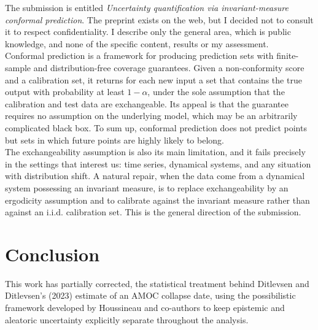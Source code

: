 \documentclass[12pt,a4paper]{article}
\theoremstyle{definition}
\theoremstyle{plain}
\begin{document}
\noindent The submission is entitled \emph{Uncertainty quantification via invariant-measure conformal
prediction}. The preprint exists on the web, but I decided not to consult it to respect confidentiality. I describe only the general area, which is public
knowledge, and none of the specific content, results or my assessment. \\

\noindent Conformal prediction \cite{shafer2008,angelopoulos2023} is a framework for producing
prediction sets with finite-sample and distribution-free coverage guarantees. Given a
non-conformity score and a calibration set, it returns for each new input a set that contains
the true output with probability at least $1-\alpha$, under the sole assumption that the
calibration and test data are exchangeable. Its appeal is that the guarantee requires no
assumption on the underlying model, which may be an arbitrarily complicated black box. To sum up, conformal prediction does not predict points but sets in which future points are highly likely to belong. \\

\noindent The exchangeability assumption is also its main limitation, and it fails precisely in the
settings that interest us: time series, dynamical systems, and any situation with distribution
shift. A natural repair, when the data come from a dynamical system possessing an invariant
measure, is to replace exchangeability by an ergodicity assumption and to calibrate against the
invariant measure rather than against an i.i.d. calibration set. This is the general direction
of the submission. \\


\bigskip
\section{Conclusion}
\label{sec:conclusion}

This work has partially corrected, the statistical treatment behind Ditlevsen
and Ditlevsen's (2023) estimate of an AMOC collapse date, using the possibilistic framework
developed by Houssineau and co-authors to keep epistemic and aleatoric uncertainty explicitly
separate throughout the analysis.\\
 
\end{document}

